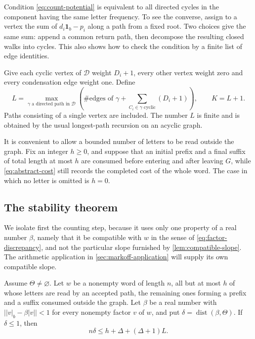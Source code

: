 Condition \eqref{eq:count-potential} is equivalent to all directed cycles
in the component having the same letter frequency. To see the converse,
assign to a vertex the sum of $d_i\mathbf1_b-p_i$ along a path from a fixed
root. Two choices give the same sum: append a common return path, then
decompose the resulting closed walks into cycles. This also shows how to
check the condition by a finite list of edge identities.

Give each cyclic vertex of $\mathcal D$ weight $D_i+1$, every other vertex
weight zero and every condensation edge weight one. Define
\begin{equation}
 L=\max_{\gamma\text{ a directed path in }\mathcal D}
 \left(\#\text{edges of }\gamma+
       \sum_{C_i\in\gamma\text{ cyclic}}(D_i+1)\right),\qquad K=L+1.
 \label{eq:condensation-budget}
\end{equation}
Paths consisting of a single vertex are included. The number $L$ is finite
and is obtained by the usual longest-path recursion on an acyclic graph.

It is convenient to allow a bounded number of letters to be read outside
the graph. Fix an integer $h\geqslant0$, and suppose that an initial
prefix and a final suffix of total length at most $h$ are consumed before
entering and after leaving $G$, while \eqref{eq:abstract-cost} still
records the completed cost of the whole word. The case in which no letter
is omitted is $h=0$.

\subsection{The stability theorem}

We isolate first the counting step, because it uses only one property of a
real number $\beta$, namely that it be compatible with $w$ in the sense of
\eqref{eq:factor-discrepancy}, and not the particular slope furnished by
\cref{lem:compatible-slope}. The arithmetic application in
\cref{sec:markoff-application} will supply its own compatible slope.

\begin{lemma}
\label{lem:budget}
Assume $\Theta\ne\varnothing$. Let $w$ be a nonempty word of length $n$, all
but at most $h$ of whose letters are read by an accepted path, the
remaining ones forming a prefix and a suffix consumed outside the graph.
Let $\beta$ be a real number with
$\bigl||v|_b-\beta|v|\bigr|<1$ for every nonempty factor $v$ of $w$, and put
$\delta=\operatorname{dist}(\beta,\Theta)$. If $\delta\leqslant1$, then
\begin{equation}
 n\delta\leqslant h+\Delta+(\Delta+1)L.
 \label{eq:budget}
\end{equation}
\end{lemma}

